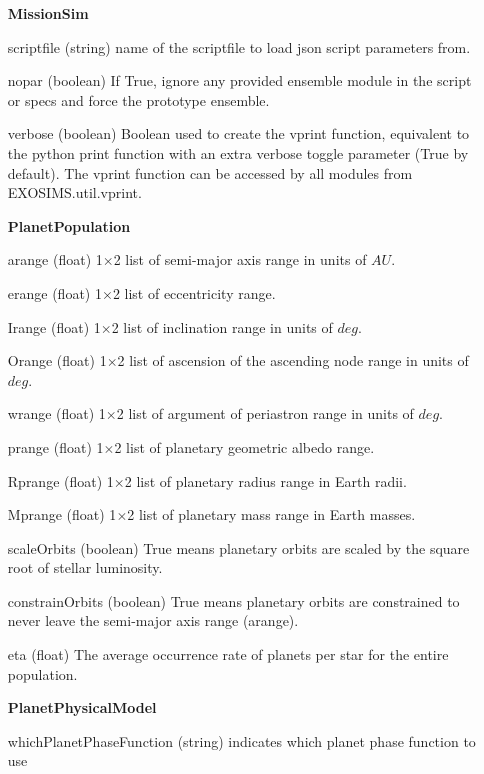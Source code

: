 \documentclass[cleanfoot]{asme2ej}
\begin{document}
\begin{itemize}[leftmargin=1.5in,font={\ttfamily}]

\item[\textbf{MissionSim}]
\item[scriptfile] (string) name of the scriptfile to load json script parameters from.
\item[nopar] (boolean) If True, ignore any provided ensemble module in the script or specs and force the prototype ensemble.
\item[verbose] (boolean) Boolean used to create the vprint function, equivalent to the python print function with an extra verbose toggle parameter (True by default). The vprint function can be accessed by all modules from EXOSIMS.util.vprint.

\item[\textbf{PlanetPopulation}]
\item[arange] (float) 1$\times$2 list of semi-major axis range in units of $ AU $. 
\item[erange] (float) 1$\times$2 list of eccentricity range.
\item[Irange] (float) 1$\times$2 list of inclination range in units of $ deg $.  
\item[Orange] (float) 1$\times$2 list of ascension of the ascending node range in units of $ deg $.  
\item[wrange] (float) 1$\times$2 list of argument of periastron range in units of $ deg $. 
\item[prange] (float) 1$\times$2 list of planetary geometric albedo range.  
\item[Rprange] (float) 1$\times$2 list of planetary radius range in Earth radii.  
\item[Mprange] (float) 1$\times$2 list of planetary mass range in Earth masses.  
\item [scaleOrbits] (boolean) True means planetary orbits are scaled by the square root of stellar luminosity. 
\item[constrainOrbits] (boolean) True means planetary orbits are constrained to never leave the semi-major axis range (arange).
\item[eta] (float) The average occurrence rate of planets per star for the entire population.

\item[\textbf{PlanetPhysicalModel}]
\item[whichPlanetPhaseFunction] (string) indicates which planet phase function to use


\end{itemize}
\end{document}
